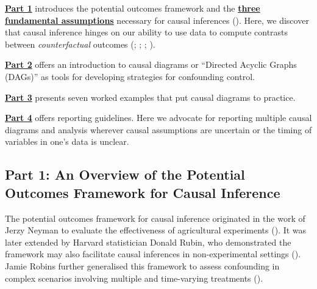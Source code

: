 \documentclass[
  singlecolumn]{article}
\begin{document}
\hyperref[section-part1]{\textbf{Part 1}} introduces the potential
outcomes framework and the
\hyperref[sec-three-fundamental-assumptions]{\textbf{three fundamental
assumptions}} necessary for causal inferences
(). Here, we discover
that causal inference hinges on our ability to use data to compute
contrasts between \emph{counterfactual} outcomes
(;
;
;
).

\hyperref[section-part2]{\textbf{Part 2}} offers an introduction to
causal diagrams or ``Directed Acyclic Graphs (DAGs)'' as tools for
developing strategies for confounding control.

\hyperref[section-part3]{\textbf{Part 3}} presents seven worked examples
that put causal diagrams to practice.

\hyperref[section-part4]{\textbf{Part 4}} offers reporting guidelines.
Here we advocate for reporting multiple causal diagrams and analysis
wherever causal assumptions are uncertain or the timing of variables in
one's data is unclear.

\subsection{Part 1: An Overview of the Potential Outcomes Framework for
Causal Inference}\label{section-part1}

The potential outcomes framework for causal inference originated in the
work of Jerzy Neyman to evaluate the effectiveness of agricultural
experiments (). It was
later extended by Harvard statistician Donald Rubin, who demonstrated
the framework may also facilitate causal inferences in non-experimental
settings (). Jamie Robins further
generalised this framework to assess confounding in complex scenarios
involving multiple and time-varying treatments
().
\end{document}

